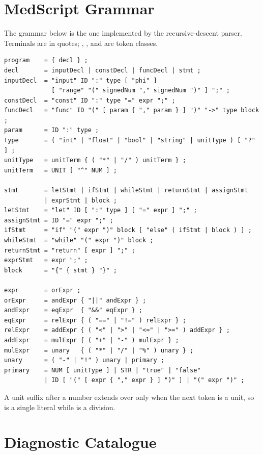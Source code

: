 \appendix
\section{MedScript Grammar}

The grammar below is the one implemented by the recursive-descent parser. Terminals are in quotes; ,
,  and  are token classes.

\begin{lstlisting}[language={},numbers=none,basicstyle=\ttfamily\footnotesize]
program    = { decl } ;
decl       = inputDecl | constDecl | funcDecl | stmt ;
inputDecl  = "input" ID ":" type [ "phi" ]
             [ "range" "(" signedNum "," signedNum ")" ] ";" ;
constDecl  = "const" ID ":" type "=" expr ";" ;
funcDecl   = "func" ID "(" [ param { "," param } ] ")" "->" type block ;
param      = ID ":" type ;
type       = ( "int" | "float" | "bool" | "string" | unitType ) [ "?" ] ;
unitType   = unitTerm { ( "*" | "/" ) unitTerm } ;
unitTerm   = UNIT [ "^" NUM ] ;

stmt       = letStmt | ifStmt | whileStmt | returnStmt | assignStmt
           | exprStmt | block ;
letStmt    = "let" ID [ ":" type ] [ "=" expr ] ";" ;
assignStmt = ID "=" expr ";" ;
ifStmt     = "if" "(" expr ")" block [ "else" ( ifStmt | block ) ] ;
whileStmt  = "while" "(" expr ")" block ;
returnStmt = "return" [ expr ] ";" ;
exprStmt   = expr ";" ;
block      = "{" { stmt } "}" ;

expr       = orExpr ;
orExpr     = andExpr { "||" andExpr } ;
andExpr    = eqExpr  { "&&" eqExpr } ;
eqExpr     = relExpr { ( "==" | "!=" ) relExpr } ;
relExpr    = addExpr { ( "<" | ">" | "<=" | ">=" ) addExpr } ;
addExpr    = mulExpr { ( "+" | "-" ) mulExpr } ;
mulExpr    = unary   { ( "*" | "/" | "%" ) unary } ;
unary      = ( "-" | "!" ) unary | primary ;
primary    = NUM [ unitType ] | STR | "true" | "false"
           | ID [ "(" [ expr { "," expr } ] ")" ] | "(" expr ")" ;
\end{lstlisting}

A unit suffix after a number extends over \code{/} only when the next token is a unit, so  is a single
literal while  is a division.

\section{Diagnostic Catalogue}

